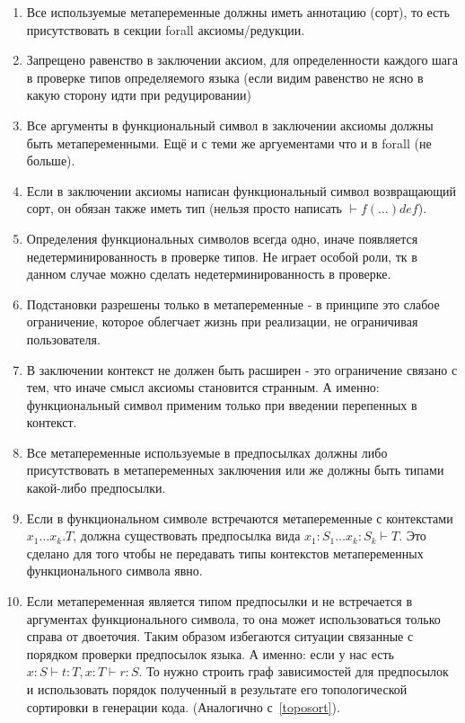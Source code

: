 \begin{enumerate}

\item Все используемые метапеременные должны иметь аннотацию (сорт), то есть присутствовать в секции forall аксиомы/редукции.

\item Запрещено равенство в заключении аксиом, для определенности каждого шага в проверке типов определяемого языка (если видим равенство не ясно в какую сторону идти при редуцировании)

\item Все аргументы в функциональный символ в заключении аксиомы должны быть метапеременными. Ещё и с теми же аргуементами что и в forall (не больше).

\item Если в заключении аксиомы написан функциональный символ возвращающий сорт, он обязан также иметь тип (нельзя просто написать $ \vdash f(\ldots) def$).

\item Определения функциональных символов всегда одно, иначе появляется недетерминированность в проверке типов. Не играет особой роли, тк в данном случае можно сделать недетерминированность в проверке.

\item Подстановки разрешены только в метапеременные - в принципе это слабое ограничение, которое облегчает жизнь при реализации, не ограничивая пользователя.

\item В заключении контекст не должен быть расширен - это ограничение связано с тем, что иначе смысл аксиомы становится странным. А именно: функциональный символ применим только при введении перепенных в контекст.

\item \label{tm:Meta} Все метапеременные используемые в предпосылках должны либо присутствовать в метапеременных заключения или же должны быть типами какой-либо предпосылки.

\item Если в функциональном символе встречаются метапеременные с контекстами $x_1 \ldots x_k . T$, должна существовать предпосылка вида $x_1 : S_1 \ldots x_k : S_k  \vdash T$. Это сделано для того чтобы не передавать типы контекстов метапеременных функционального символа явно.

\item Если метапеременная является типом предпосылки и не встречается в аргументах функционального символа, то она может использоваться только справа от двоеточия. Таким образом избегаются ситуации связанные с порядком проверки предпосылок языка. А именно: если у нас есть $x : S \vdash t : T, x:T \vdash r : S$. То нужно строить граф зависимостей для предпосылок и использовать порядок полученный в результате его топологической сортировки в генерации кода. (Аналогично с~\ref{toposort}).


\end{enumerate}
